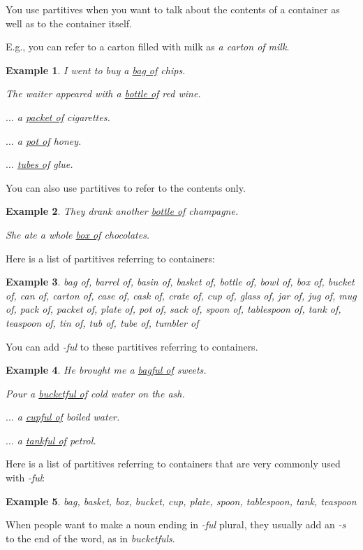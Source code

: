 \documentclass[oneside]{book}
\numberwithin{equation}{section}
\newtheorem{example}{Example}[section]
\begin{document}
%
\noindent{} You use partitives when you want to talk about the contents of a container as well as to the container itself.

E.g., you can refer to a carton filled with milk as \textit{a carton of milk}.
\begin{example}
    I went to buy a \underline{bag of} chips.
    
    The waiter appeared with a \underline{bottle of} red wine.
    
    $\ldots$ a \underline{packet of} cigarettes.
    
    $\ldots$ a \underline{pot of} honey.
    
    $\ldots$ \underline{tubes of} glue.
\end{example}
You can also use partitives to refer to the contents only.
\begin{example}
    They drank another \underline{bottle of} champagne.
    
    She ate a whole \underline{box of} chocolates.
\end{example}
Here is a list of partitives referring to containers:
\begin{example}
    bag of, barrel of, basin of, basket of, bottle of, bowl of, box of, bucket of, can of, carton of, case of, cask of, crate of, cup of, glass of, jar of, jug of, mug of, pack of, packet of, plate of, pot of, sack of, spoon of, tablespoon of, tank of, teaspoon of, tin of, tub of, tube of, tumbler of
\end{example}
%
\noindent{} You can add \textit{-ful} to these partitives referring to containers.
\begin{example}
    He brought me a \underline{bagful of} sweets.
    
    Pour a \underline{bucketful of} cold water on the ash.
    
    $\ldots$ a \underline{cupful of} boiled water.
    
    $\ldots$ a \underline{tankful of} petrol.
\end{example}
Here is a list of partitives referring to containers that are very commonly used with \textit{-ful}:
\begin{example}
    bag, basket, box, bucket, cup, plate, spoon, tablespoon, tank, teaspoon
\end{example}
When people want to make a noun ending in \textit{-ful} plural, they usually add an \textit{-s} to the end of the word, as in \textit{bucketfuls}.
\end{document}
